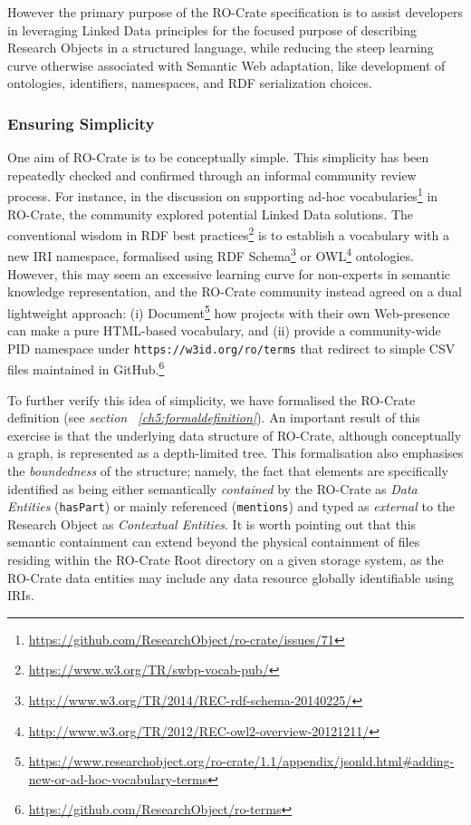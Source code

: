 However the primary purpose of the RO-Crate specification is to assist
developers in leveraging Linked Data principles for the focused purpose
of describing Research Objects in a structured language, while reducing
the steep learning curve otherwise associated with Semantic Web
adaptation, like development of ontologies, identifiers, namespaces, and
RDF serialization choices.

\subsubsection{Ensuring Simplicity}\label{ch5:simplicity}

One aim of RO-Crate is to be conceptually simple. This simplicity has
been repeatedly checked and confirmed through an informal community
review process. For instance, in the discussion on supporting ad-hoc
vocabularies\footnote{\url{https://github.com/ResearchObject/ro-crate/issues/71}} in
RO-Crate, the community explored potential Linked Data solutions. The
conventional wisdom in RDF best
practices\footnote{\url{https://www.w3.org/TR/swbp-vocab-pub/}} is to establish a
vocabulary with a new IRI namespace, formalised using RDF
Schema\footnote{\url{http://www.w3.org/TR/2014/REC-rdf-schema-20140225/}} or
\acrshort{OWL}\footnote{\url{http://www.w3.org/TR/2012/REC-owl2-overview-20121211/}}
ontologies. However, this may seem an excessive learning curve for
non-experts in semantic knowledge representation, and the RO-Crate
community instead agreed on a dual lightweight approach: (i)
Document\footnote{\url{https://www.researchobject.org/ro-crate/1.1/appendix/jsonld.html\#adding-new-or-ad-hoc-vocabulary-terms}}
how projects with their own Web-presence can make a pure HTML-based
vocabulary, and (ii) provide a community-wide PID namespace under
\texttt{https://w3id.org/ro/terms} that redirect to simple CSV files
maintained in GitHub.\footnote{\url{https://github.com/ResearchObject/ro-terms}}

To further verify this idea of simplicity, we have formalised the
RO-Crate definition (see \textit{section ~\vref{ch5:formaldefinition}}). An
important result of this exercise is that the underlying data structure
of RO-Crate, although conceptually a graph, is represented as a
depth-limited tree. This formalisation also emphasises the
\textit{boundedness} of the structure; namely, the fact that elements are
specifically identified as being either semantically \textit{contained} by the
RO-Crate as \textit{Data Entities} (\texttt{hasPart}) or mainly referenced
(\texttt{mentions}) and typed as \textit{external} to the Research Object as
\textit{Contextual Entities}. It is worth pointing out that this semantic
containment can extend beyond the physical containment of files
residing within the RO-Crate Root directory on a given storage system,
as the RO-Crate data entities may include any data resource globally
identifiable using IRIs.


